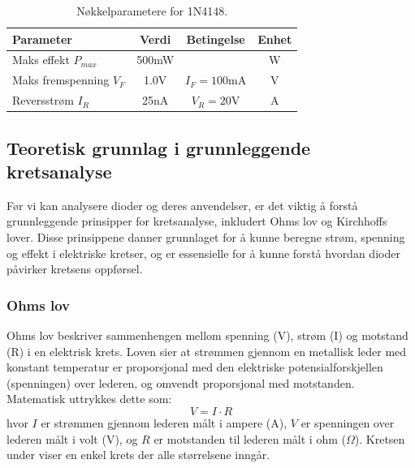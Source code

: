 \begin{table}[H]
\centering
\caption{Nøkkelparametere for 1N4148.}
\label{tab:diode_params_1N4148}
\begin{tabular}{lccc}
\toprule
\textbf{Parameter} & \textbf{Verdi} & \textbf{Betingelse} & \textbf{Enhet} \\
\midrule

Maks effekt $P_{max}$ & 500mW &  & W \\

Maks fremspenning $V_F$ & 1.0V & $I_F = 100\text{mA}$ & V \\

Reversstrøm $I_R$ & 25nA & $V_R = 20\text{V}$ & A \\

\bottomrule
\end{tabular}
\end{table}




\subsection{Teoretisk grunnlag i grunnleggende kretsanalyse}
Før vi kan analysere dioder og deres anvendelser, er det viktig å forstå grunnleggende prinsipper for kretsanalyse, inkludert Ohms lov og Kirchhoffs lover. Disse prinsippene danner grunnlaget for å kunne beregne strøm, spenning og effekt i elektriske kretser, og er essensielle for å kunne forstå hvordan dioder påvirker kretsens oppførsel.

\subsubsection{Ohms lov}
Ohms lov beskriver sammenhengen mellom spenning (V), strøm (I) og motstand (R) i en elektrisk krets. Loven sier at strømmen gjennom en metallisk leder med konstant temperatur er proporsjonal med den elektriske potensialforskjellen (spenningen) over lederen, og omvendt proporsjonal med motstanden. Matematisk uttrykkes dette som:
\begin{equation}
    V = I \cdot R
\end{equation}
\noindent
hvor $I$ er strømmen gjennom lederen målt i ampere (A), $V$ er spenningen over lederen målt i volt (V), og $R$ er motstanden til lederen målt i ohm ($\Omega$). Kretsen under viser en enkel krets der alle størrelsene inngår.


